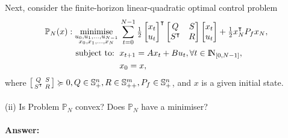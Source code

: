 \documentclass[a4paper,11pt,reqno]{amsart}
\newcommand{\N}{{\rm I\!N}}
\newcommand{\tran}{\intercal}
\DeclareMathOperator*{\minimise}{minimise}
\begin{document}
\
\\ \\
Next, consider the finite-horizon linear-quadratic optimal control problem
\begin{subequations}
    \begin{align}
        \mathbb{P}_N(x): \minimise_{\substack{u_0,u_1,\ldots,u_{N-1}\\ x_0,x_1,\ldots,x_N}} \,
         & \sum_{t=0}^{N-1}\textstyle\frac{1}{2}
         \begin{bmatrix}
             x_t\\
             u_t
         \end{bmatrix}^{\tran}
         \begin{bmatrix}
             Q&S\\
             S^{\tran}&R
         \end{bmatrix}
         \begin{bmatrix}
             x_t\\
             u_t
         \end{bmatrix}
         +\frac{1}{2}x_N^{\tran}P_fx_N,
        \\
        \text{subject to: }\,
         & x_{t+1} = A x_t + B u_t, \forall t\in\N_{[0, N-1]},
        \\
         & x_{0} = x,
    \end{align}
\end{subequations}
where $\begin{bsmallmatrix}Q&S\\S^{\tran}&R\end{bsmallmatrix}\succcurlyeq 0, Q\in \mathbb{S}^n_+, R\in \mathbb{S}^m_{++}, P_f\in \mathbb{S}^n_{+}$, and $x$ is a given initial state.
\\ \\
(ii) Is Problem $\mathbb{P}_N$ convex? Does $\mathbb{P}_N$ have a minimiser?
\\ \\
\textbf{Answer:}
\end{document}
